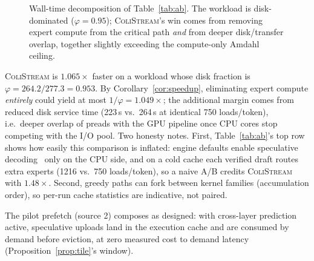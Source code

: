 \documentclass[11pt]{article}
\theoremstyle{definition}
\theoremstyle{remark}
\newcommand{\colistream}{\textsc{ColiStream}}
\begin{document}
\begin{figure}[t]
\centering
{}
\caption{Wall-time decomposition of Table~\ref{tab:ab}. The workload is
disk-dominated ($\varphi = 0.95$); \colistream's win comes from removing
expert compute from the critical path \emph{and} from deeper disk/transfer
overlap, together slightly exceeding the compute-only Amdahl ceiling.}
\label{fig:ab}
\end{figure}

\colistream{} is $1.065\times$ faster on a workload whose disk fraction is
$\varphi = 264.2/277.3 = 0.953$. By Corollary~\ref{cor:speedup}, eliminating
expert compute \emph{entirely} could yield at most $1/\varphi = 1.049\times$;
the additional margin comes from reduced disk service time (223\,s vs.\
264\,s at identical 750 loads/token), i.e.\ deeper overlap of preads with
the GPU pipeline once CPU cores stop competing with the I/O pool. Two
honesty notes. First, Table~\ref{tab:ab}'s top row shows how easily this
comparison is inflated: engine defaults enable speculative
decoding~\citep{leviathan2023fast} only on the CPU side, and on a cold cache
each verified draft routes extra experts (1216 vs.\ 750 loads/token), so a
naive A/B credits \colistream{} with $1.48\times$. Second, greedy paths can
fork between kernel families (accumulation order), so per-run cache
statistics are indicative, not paired.

The pilot prefetch (source 2) composes as designed: with cross-layer
prediction active, speculative uploads land in the execution cache and are
consumed by demand before eviction, at zero measured cost to demand latency
(Proposition~\ref{prop:tile}'s window).
\end{document}
